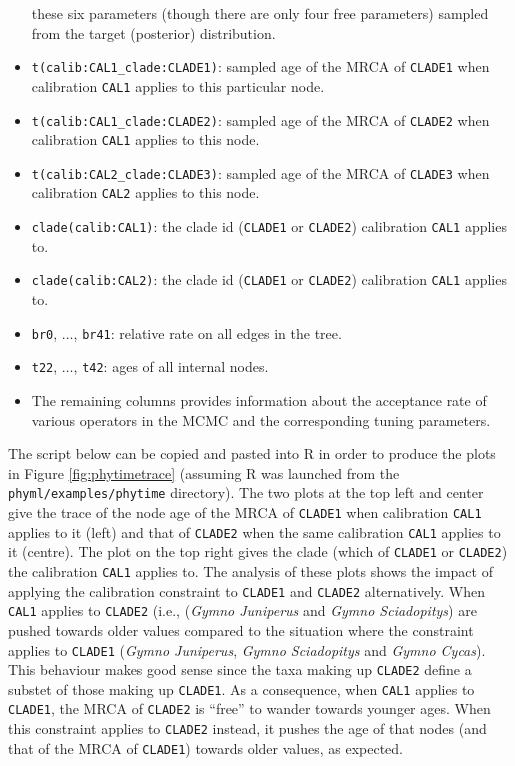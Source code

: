 \documentclass[a4paper,12pt]{article}
\newcommand{\x}[1]{\texttt{#1}}
\begin{document}
\begin{itemize}
  these six parameters (though there are only four free parameters) sampled from the target
  (posterior) distribution.  
\item \x{t(calib:CAL1\_clade:CLADE1)}: sampled age of the MRCA of \x{CLADE1} when calibration
  \x{CAL1} applies to this particular node.
\item \x{t(calib:CAL1\_clade:CLADE2)}: sampled age of the MRCA of \x{CLADE2} when calibration
  \x{CAL1} applies to this node.
\item \x{t(calib:CAL2\_clade:CLADE3)}: sampled age of the MRCA of \x{CLADE3} when calibration
  \x{CAL2} applies to this node.
\item \x{clade(calib:CAL1)}: the clade id (\x{CLADE1} or \x{CLADE2}) calibration \x{CAL1} applies
  to.
\item \x{clade(calib:CAL2)}: the clade id (\x{CLADE1} or \x{CLADE2}) calibration \x{CAL1} applies
  to.
\item \x{br0}, $\ldots$, \x{br41}: relative rate on all edges in the tree.
\item \x{t22}, $\ldots$, \x{t42}: ages of all internal nodes.
\item The remaining columns provides information about the acceptance rate of various operators in
  the MCMC and the corresponding tuning parameters.
\end{itemize}

The script below can be copied and pasted into R in order to produce the plots in Figure
\ref{fig:phytimetrace} (assuming R was launched from the \x{phyml/examples/phytime} directory). The two plots at the top left and center give the trace of the node age of
the MRCA of \x{CLADE1} when calibration \x{CAL1} applies to it (left) and that of \x{CLADE2} when
the same calibration \x{CAL1} applies to it (centre). The plot on the top right gives the clade (which of
\x{CLADE1} or \x{CLADE2}) the calibration \x{CAL1} applies to. The analysis of these  plots
shows the impact of applying the calibration constraint to \x{CLADE1} and \x{CLADE2} alternatively.
When \x{CAL1} applies to \x{CLADE2} (i.e., ({\em Gymno Juniperus} and {\em Gymno
  Sciadopitys}) are pushed towards older values compared to the situation where the constraint applies
to \x{CLADE1} ({\em Gymno Juniperus}, {\em Gymno Sciadopitys} and {\em Gymno Cycas}).
This behaviour makes good sense since the taxa making up \x{CLADE2} define a substet of those making up \x{CLADE1}. As a consequence, when
\x{CAL1} applies to \x{CLADE1}, the MRCA of \x{CLADE2} is ``free'' to wander towards younger
ages. When this constraint applies to \x{CLADE2} instead, it pushes the age of that nodes (and that
of the MRCA of \x{CLADE1}) towards older values, as expected.
\end{document}

